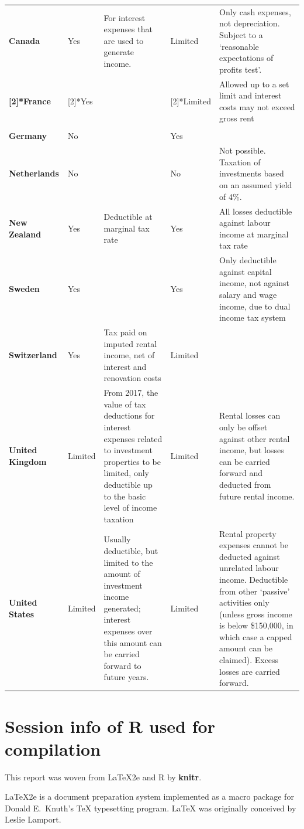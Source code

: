 \begin{subappendices}
{\begin{tabularx}{1.4\linewidth}{>{\bfseries}l>{\raggedleft}p{1.55cm}X>{\raggedleft}p{1.95cm}X}
    Canada & Yes   & For interest expenses that are used to generate income. & Limited & Only cash expenses, not depreciation. Subject to a ‘reasonable expectations of profits test’. \\
    \multirow{2}[2]{*}{France} & \multirow{2}[2]{*}{Yes} & \multirow{2}[2]{*}{} & \multirow{2}[2]{*}{Limited} & {Allowed up to a set limit and interest costs may not exceed gross rent} \\
          &       &       &       &  \\
    Germany & No    &       & Yes   &  \\
    Netherlands & No    &       & No    & Not possible. Taxation of investments based on an assumed yield of 4\%. \\
    New Zealand & Yes   & Deductible at marginal tax rate & Yes   & All losses deductible against labour income at marginal tax rate \\
    Sweden & Yes   &       & Yes   & Only deductible against capital income, not against salary and wage income, due to dual income tax system \\
    Switzerland & Yes   & Tax paid on imputed rental income, net of interest and renovation costs & Limited &  \\
    United Kingdom & Limited & From 2017, the value of tax deductions for interest expenses related to investment properties to be limited, only deductible up to the basic level of income taxation & Limited & Rental losses can only be offset against other rental income, but losses can be carried forward and deducted from future rental income. \\
    United States & Limited & Usually deductible, but limited to the amount of investment income generated; interest expenses over this amount can be carried forward to future years. & Limited & Rental property expenses cannot be deducted against unrelated labour income. Deductible from other ‘passive’ activities only (unless gross income is below \$150,000, in which case a capped amount can be claimed). Excess losses are carried forward. \\
    \bottomrule
    \end{tabularx}
}

\chapter{Session info of R used for compilation}
This report was woven from \LaTeX2e and R by \textbf{knitr}. 

\LaTeX2e{} is a document preparation system implemented as a macro package for Donald E.\ Knuth's \TeX{} typesetting program. \LaTeX{} was originally conceived by Leslie Lamport. 


\end{subappendices}
